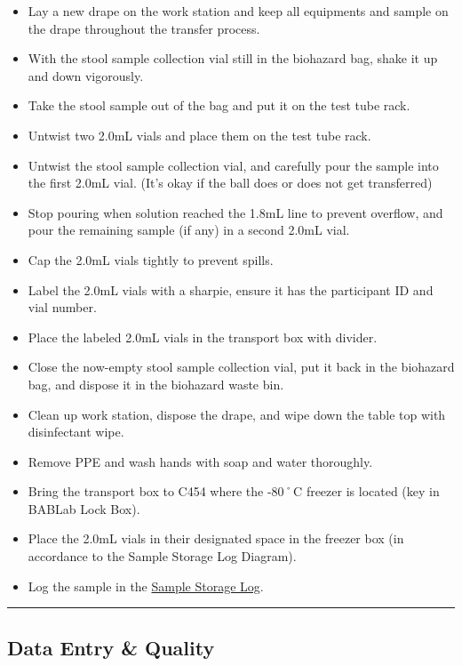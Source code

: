 \documentclass[]{book}
\providecommand{\tightlist}{%
  \setlength{\itemsep}{0pt}\setlength{\parskip}{0pt}}
\begin{document}
\begin{itemize}
\tightlist
\item
  Lay a new drape on the work station and keep all equipments and sample on the drape throughout the transfer process.
\item
  With the stool sample collection vial still in the biohazard bag, shake it up and down vigorously.
\item
  Take the stool sample out of the bag and put it on the test tube rack.
\item
  Untwist two 2.0mL vials and place them on the test tube rack.
\item
  Untwist the stool sample collection vial, and carefully pour the sample into the first 2.0mL vial. (It's okay if the ball does or does not get transferred)
\item
  Stop pouring when solution reached the 1.8mL line to prevent overflow, and pour the remaining sample (if any) in a second 2.0mL vial.
\item
  Cap the 2.0mL vials tightly to prevent spills.
\item
  Label the 2.0mL vials with a sharpie, ensure it has the participant ID and vial number.
\item
  Place the labeled 2.0mL vials in the transport box with divider.
\item
  Close the now-empty stool sample collection vial, put it back in the biohazard bag, and dispose it in the biohazard waste bin.
\item
  Clean up work station, dispose the drape, and wipe down the table top with disinfectant wipe.
\item
  Remove PPE and wash hands with soap and water thoroughly.
\item
  Bring the transport box to C454 where the -80˚C freezer is located (key in BABLab Lock Box).
\item
  Place the 2.0mL vials in their designated space in the freezer box (in accordance to the Sample Storage Log Diagram).
\item
  Log the sample in the \href{https://app.box.com/file/630322897864}{Sample Storage Log}.
\end{itemize}

\begin{center}\rule{0.5\linewidth}{0.5pt}\end{center}

\hypertarget{data-entry-quality}{%
\subsection{Data Entry \& Quality}\label{data-entry-quality}}
\end{document}
